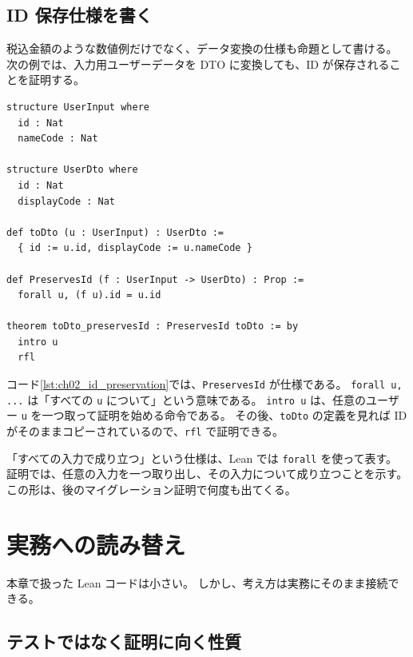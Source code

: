 \subsection{ID 保存仕様を書く}

税込金額のような数値例だけでなく、データ変換の仕様も命題として書ける。
次の例では、入力用ユーザーデータを DTO に変換しても、ID が保存されることを証明する。

\begin{listing}[htbp]
\begin{verbatim}
structure UserInput where
  id : Nat
  nameCode : Nat

structure UserDto where
  id : Nat
  displayCode : Nat

def toDto (u : UserInput) : UserDto :=
  { id := u.id, displayCode := u.nameCode }

def PreservesId (f : UserInput -> UserDto) : Prop :=
  forall u, (f u).id = u.id

theorem toDto_preservesId : PreservesId toDto := by
  intro u
  rfl
\end{verbatim}
\caption{DTO 変換で ID が保存されることを証明する}
\label{lst:ch02_id_preservation}
\end{listing}

コード\ref{lst:ch02_id_preservation}では、\texttt{PreservesId} が仕様である。
\texttt{forall u, ...} は「すべての \texttt{u} について」という意味である。
\texttt{intro u} は、任意のユーザー \texttt{u} を一つ取って証明を始める命令である。
その後、\texttt{toDto} の定義を見れば ID がそのままコピーされているので、\texttt{rfl} で証明できる。

\begin{intuitionbox}
「すべての入力で成り立つ」という仕様は、Lean では \texttt{forall} を使って表す。
証明では、任意の入力を一つ取り出し、その入力について成り立つことを示す。
この形は、後のマイグレーション証明で何度も出てくる。
\end{intuitionbox}


\section{実務への読み替え}

本章で扱った Lean コードは小さい。
しかし、考え方は実務にそのまま接続できる。

\subsection{テストではなく証明に向く性質}


